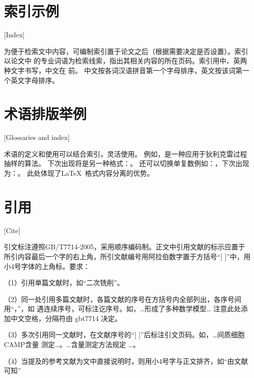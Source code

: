\section{索引示例}[Index]

为便于检索文中内容，可编制索引置于论文之后（根据需要决定是否设置）。索引以论文中
的专业词语为检索线索，指出其相关内容的所在页码。索引用中、英两种文字书写，中文在
前。
中文按各词汉语拼音第一个字母排序，英文按该词第一个英文字母排序。

\section{术语排版举例}[Glossaries and index]

术语的定义和使用可以结合索引，灵活使用。
例如，\gtssbp 是一种应用于狄利克雷过程抽样的算法。
下次出现将是另一种格式：\gtssbp 。
还可以切换单复数例如：\gscnas ，下次出现为：\gscnas 。
此处体现了\LaTeX\ 格式内容分离的优势。

\section{引用}[Cite]

引文标注遵照GB/T7714-2005，采用顺序编码制。正文中引用文献的标示应置于所引内容最后一个字的右上角，所引文献编号用阿拉伯数字置于方括号“[ ]”中，用小4号字体的上角标。要求：

（1）引用单篇文献时，如“二次铣削\cite{cnproceed}”。

（2）同一处引用多篇文献时，各篇文献的序号在方括号内全部列出，各序号间用“，”，如
遇连续序号，可标注讫序号。如，…形成了多种数学模型\cite{cnarticle,cnproceed}…
注意此处添加中文空格，分隔符由 gbt7714 决定。

（3）多次引用同一文献时，在文献序号的“[ ]”后标注引文页码。如，…间质细胞CAMP含量
测定\cite[100-197]{cnarticle}…。…含量测定方法规定
\cite[92]{cnarticle}…。

（4）当提及的参考文献为文中直接说明时，则用小4号字与正文排齐，如“由文献可知”


